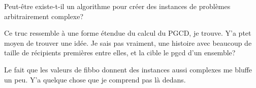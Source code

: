 \documentclass[10pt]{article}\usepackage[correction,nu]{esial}
\begin{document}
\Question Peut-être existe-t-il un algorithme pour créer des instances de
problèmes arbitrairement complexe?

\begin{Reponse}
  Ce truc ressemble à une forme étendue du calcul du PGCD, je trouve. Y'a ptet
  moyen de trouver une idée. Je sais pas vraiment, une histoire avec beaucoup
  de taille de récipients premières entre elles, et la cible le pgcd d'un
  ensemble? 

  Le fait que les valeurs de fibbo donnent des instances aussi complexes me
  bluffe un peu. Y'a quelque chose que je comprend pas là dedans.
\end{Reponse}

\end{document}
